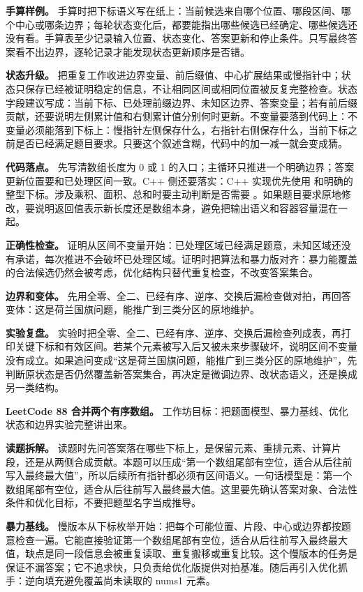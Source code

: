 \textbf{手算样例。} 手算时把下标语义写在纸上：当前候选来自哪个位置、哪段区间、哪个中心或哪条边界；每轮状态变化后，都要能指出哪些候选已经确定、哪些候选还没有看。手算表至少记录输入位置、状态变化、答案更新和停止条件。只写最终答案看不出边界，逐轮记录才能发现状态更新顺序是否错。

\textbf{状态升级。} 把重复工作收进边界变量、前后缀值、中心扩展结果或慢指针中；状态只保存已经被证明稳定的信息，不让相同区间或相同位置被反复完整检查。状态字段建议写成：当前下标、已处理前缀边界、未知区边界、答案变量；若有前后缀贡献，还要说明左侧累计值和右侧累计值分别何时更新。不变量要落到代码上：不变量必须能落到下标上：慢指针左侧保存什么，右指针右侧保存什么，当前下标之前是否已经满足题目要求。只要这个叙述含糊，代码中的加一减一就会变成猜。

\textbf{代码落点。} 先写清数组长度为 0 或 1 的入口；主循环只推进一个明确边界；答案更新位置要和已处理区间一致。C++ 侧还要落实：C++ 实现优先使用  和明确的整型下标。涉及乘积、面积、总和时要主动判断是否需要 。如果题目要求原地修改，要说明返回值表示新长度还是数组本身，避免把输出语义和容器容量混在一起。

\textbf{正确性检查。} 证明从区间不变量开始：已处理区域已经满足题意，未知区域还没有承诺，每次推进不会破坏已处理区域。证明时把算法和暴力版对齐：暴力能覆盖的合法候选仍然会被考虑，优化结构只替代重复检查，不改变答案集合。

\textbf{边界和变体。} 先用全零、全二、已经有序、逆序、交换后漏检查做对拍，再回答变体：这是荷兰国旗问题，能推广到三类分区的原地维护。

\textbf{实验复盘。} 实验时把全零、全二、已经有序、逆序、交换后漏检查列成表，再打印关键下标和有效区间。若某个元素被写入后又被未来步骤破坏，说明区间不变量没有成立。如果追问变成“这是荷兰国旗问题，能推广到三类分区的原地维护”，先判断原状态是否仍然覆盖新答案集合，再决定是微调边界、改状态语义，还是换成另一类结构。

\noindent\textbf{LeetCode 88 合并两个有序数组。} 工作坊目标：把题面模型、暴力基线、优化状态和边界实验完整讲出来。

\textbf{读题拆解。} 读题时先问答案落在哪些下标上，是保留元素、重排元素、计算片段，还是从两侧合成贡献。本题可以压成“第一个数组尾部有空位，适合从后往前写入最终最大值”，所以后续所有指针都必须有区间语义。一句话模型是：第一个数组尾部有空位，适合从后往前写入最终最大值。这里要先确认答案对象、合法性条件和优化目标，不要把题型名字当成推导。

\textbf{暴力基线。} 慢版本从下标枚举开始：把每个可能位置、片段、中心或边界都按题意检查一遍。它能直接验证第一个数组尾部有空位，适合从后往前写入最终最大值，缺点是同一段信息会被重复读取、重复搬移或重复比较。这个慢版本的任务是保证不漏答案；它不追求快，只负责给优化版提供对拍基准。随后再引入优化抓手：逆向填充避免覆盖尚未读取的 nums1 元素。


